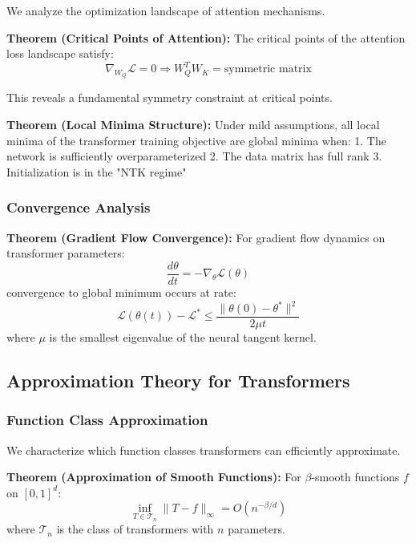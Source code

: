 \documentclass[11pt]{article}
\begin{document}
We analyze the optimization landscape of attention mechanisms.

\textbf{Theorem (Critical Points of Attention):} The critical points of the attention loss landscape satisfy:
\begin{equation}
\nabla_{W_Q} \mathcal{L} = 0 \Rightarrow W_Q^T W_K = \text{symmetric matrix}
\end{equation}

This reveals a fundamental symmetry constraint at critical points.

\textbf{Theorem (Local Minima Structure):} Under mild assumptions, all local minima of the transformer training objective are global minima when:
1. The network is sufficiently overparameterized
2. The data matrix has full rank
3. Initialization is in the "NTK regime"

\subsubsection{Convergence Analysis}

\textbf{Theorem (Gradient Flow Convergence):} For gradient flow dynamics on transformer parameters:
\begin{equation}
\frac{d\theta}{dt} = -\nabla_\theta \mathcal{L}(\theta)
\end{equation}
convergence to global minimum occurs at rate:
\begin{equation}
\mathcal{L}(\theta(t)) - \mathcal{L}^* \leq \frac{\|\theta(0) - \theta^*\|^2}{2\mu t}
\end{equation}
where $\mu$ is the smallest eigenvalue of the neural tangent kernel.

\subsection{Approximation Theory for Transformers}

\subsubsection{Function Class Approximation}

We characterize which function classes transformers can efficiently approximate.

\textbf{Theorem (Approximation of Smooth Functions):} For $\beta$-smooth functions $f$ on $[0,1]^d$:
\begin{equation}
\inf_{T \in \mathcal{T}_n} \|T - f\|_\infty = O(n^{-\beta/d})
\end{equation}
where $\mathcal{T}_n$ is the class of transformers with $n$ parameters.
\end{document}
